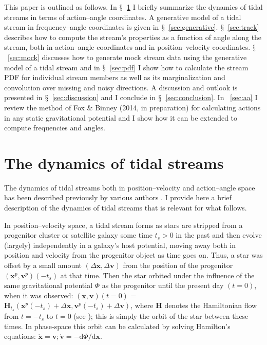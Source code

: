 \documentclass[12pt,preprint]{aastex}
\newcommand{\dd}{\mathrm{d}}
\newcommand{\eg}{e.g.}
\newcommand{\sectionname}{$\mathsection$}
\renewcommand{\vec}[1]{\ensuremath{\mathbf{#1}}}
\newcommand{\vecx}{\ensuremath{\vec{x}}}
\newcommand{\vecv}{\ensuremath{\vec{v}}}
\newcommand{\vech}{\ensuremath{\vec{H}}}
\newcommand{\ts}{\ensuremath{t_s}}
\begin{document}
This paper is outlined as follows. In \sectionname~\ref{sec:dynamics}
I briefly summarize the dynamics of tidal streams in terms of
action--angle coordinates. A generative model of a tidal stream in
frequency--angle coordinates is given in
\sectionname~\ref{sec:generative}. \sectionname~\ref{sec:track}
describes how to compute the stream's properties as a function of
angle along the stream, both in action--angle coordinates and in
position--velocity coordinates. \sectionname~\ref{sec:mock} discusses
how to generate mock stream data using the generative model of a tidal
stream and in \sectionname~\ref{sec:pdf} I show how to calculate the
stream PDF for individual stream members as well as its
marginalization and convolution over missing and noisy directions. A
discussion and outlook is presented in
\sectionname~\ref{sec:discussion} and I conclude in
\sectionname~\ref{sec:conclusion}. In \appendixname~\ref{sec:aa} I
review the method of Fox \& Binney (2014, in preparation) for
calculating actions in any static gravitational potential and I show
how it can be extended to compute frequencies and angles.


\section{The dynamics of tidal streams}\label{sec:dynamics}

The dynamics of tidal streams both in position--velocity and
action--angle space has been described previously by various authors
\citep[\eg,][]{Helmi99a,Tremaine99a,Johnston99a,Sanders13b}. I provide
here a brief description of the dynamics of tidal streams that is
relevant for what follows.

In position--velocity space, a tidal stream forms as stars are
stripped from a progenitor cluster or satellite galaxy some time $\ts
> 0$ in the past and then evolve (largely) independently in a galaxy's
host potential, moving away both in position and velocity from the
progenitor object as time goes on. Thus, a star was offset by a small
amount $(\Delta \vecx,\Delta \vecv)$ from the position of the
progenitor $(\vecx^p,\vecv^p)(-\ts)$ at that time. Then the star
orbited under the influence of the same gravitational potential $\Phi$
as the progenitor until the present day $(t=0)$, when it was observed:
$(\vecx,\vecv)(t=0)$ = $\vech_{\ts}(\vecx^p(-\ts)+\Delta
\vecx,\vecv^p(-\ts)+\Delta \vecv)$, where $\vech$ denotes the
Hamiltonian flow from $t=-\ts$ to $t=0$ (see
\citealt{binneytremaine}); this is simply the orbit of the star
between these times. In phase-space this orbit can be calculated by
solving Hamilton's equations: $\dot{\vecx} = \vecv; \dot{\vecv} = -
\dd \Phi / \dd \vecx$.
\end{document}
